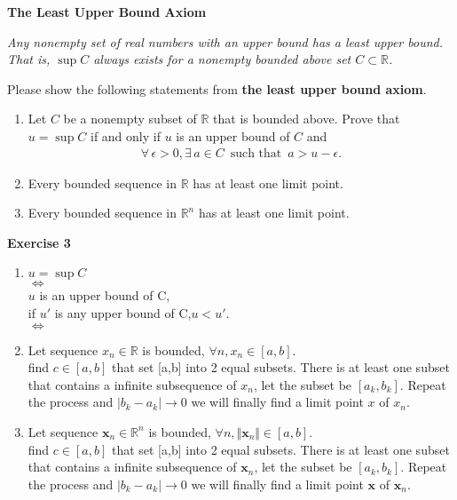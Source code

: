 \documentclass[11pt,letter,notitlepage]{article}
\theoremstyle{definition}
\begin{document}
		
		
		\begin{exercise}
			\textbf{The Least Upper Bound Axiom}
			
			
			\emph{Any nonempty set of real numbers with an upper bound has a least upper bound. That is, $\sup  C$ always exists for a nonempty bounded above set $C \subset \mathbb{R}$.}
			
			Please show the following statements from \textbf{the least upper bound axiom}.
			\begin{enumerate}
				\item Let $C$ be a nonempty subset of $\mathbb{R}$ that is bounded above. Prove that $u = \sup C$ if and only if $u$ is an upper bound of $C$ and
				\begin{align*}
					\forall\,\epsilon>0,\exists\,a \in C\,\text{ such that }\,a>u-\epsilon.
				\end{align*}
				\item  Every bounded sequence in $\mathbb{R}$ has at least one limit point.
				\item Every bounded sequence in $\mathbb{R}^n$ has at least one limit point.
			\end{enumerate}
		\end{exercise}
		
		\begin{solution}
		\textbf{Exercise 3}
			\begin{enumerate}
                \item
                $u=\sup C$\\
                $\Leftrightarrow$\\
                $u$ is an upper bound of C,\\
                if $u'$ is any upper bound of C,$u<u'$.\\
                $\Leftrightarrow$\\
                
                \item
                Let sequence ${x_n}\in\mathbb{R}$ is bounded, $\forall n, x_n\in[a,b]$.\\
                find $c\in [a,b]$ that set [a,b] into 2 equal subsets. There is at least one subset that contains a infinite subsequence of ${x_n}$, let the subset be $[a_k,b_k]$. Repeat the process and $|b_k-a_k|\rightarrow0$ we will finally find a limit point $x$ of ${x_n}$.
                
                \item
                Let sequence ${\mathbf{x}_n}\in\mathbb{R}^n$ is bounded, $\forall n, \Vert\mathbf{x}_n\Vert\in[a,b]$.\\
                find $c\in [a,b]$ that set [a,b] into 2 equal subsets. There is at least one subset that contains a infinite subsequence of ${\mathbf{x}_n}$, let the subset be $[a_k,b_k]$. Repeat the process and $|b_k-a_k|\rightarrow0$ we will finally find a limit point $\mathbf{x}$ of ${\mathbf{x}_n}$.
            \end{enumerate}

		\end{solution}
		
\end{document}

